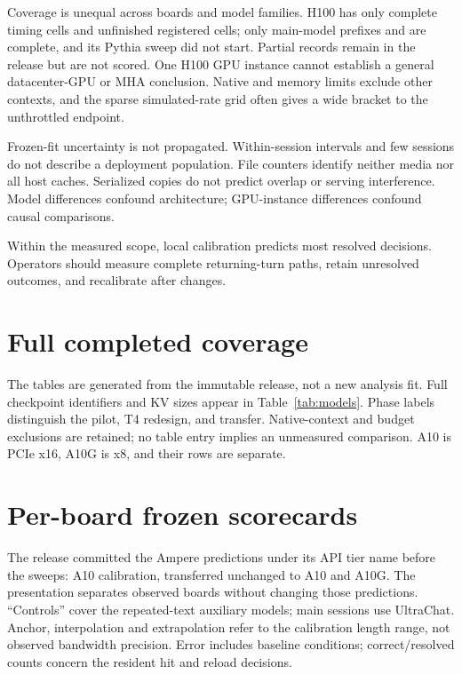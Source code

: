 \documentclass[10pt]{article}
\begin{document}
Coverage is unequal across boards and model families. H100 has only  complete timing cells and  unfinished registered cells; only main-model prefixes  and  are complete, and its Pythia sweep did not start. Partial records remain in the release but are not scored. One H100 GPU instance cannot establish a general datacenter-GPU or MHA conclusion. Native and memory limits exclude other contexts, and the sparse simulated-rate grid often gives a wide bracket to the unthrottled endpoint.

Frozen-fit uncertainty is not propagated. Within-session intervals and few sessions do not describe a deployment population. File counters identify neither media nor all host caches. Serialized copies do not predict overlap or serving interference. Model differences confound architecture; GPU-instance differences confound causal comparisons.

Within the measured scope, local calibration predicts most resolved decisions. Operators should measure complete returning-turn paths, retain unresolved outcomes, and recalibrate after changes.
\FloatBarrier
\label{main:end}
\clearpage
\label{references:start}
\renewcommand{\refname}{References}

{\small}
\clearpage
\appendix
\section{Full completed coverage}\label{app:coverage}
The tables are generated from the immutable release, not a new analysis fit. Full checkpoint identifiers and KV sizes appear in Table~\ref{tab:models}. Phase labels distinguish the pilot, T4 redesign, and transfer. Native-context and budget exclusions are retained; no table entry implies an unmeasured comparison. A10 is PCIe x16, A10G is x8, and their rows are separate.
{\footnotesize\setlength{\tabcolsep}{3pt}}

\section{Per-board frozen scorecards}\label{app:scores}
The release committed the Ampere predictions under its API tier name before the sweeps: A10 calibration, transferred unchanged to A10 and A10G. The presentation separates observed boards without changing those predictions. ``Controls'' cover the repeated-text auxiliary models; main sessions use UltraChat. Anchor, interpolation and extrapolation refer to the calibration length range, not observed bandwidth precision. Error includes baseline conditions; correct/resolved counts concern the resident hit and reload decisions.
{\footnotesize\setlength{\tabcolsep}{3pt}}
\end{document}
